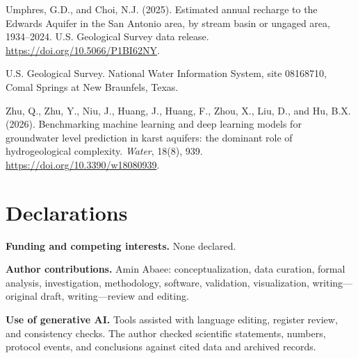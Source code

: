 \documentclass[11pt]{article}
\begin{document}
Umphres, G.D., and Choi, N.J. (2025). Estimated annual recharge to the Edwards Aquifer in the San Antonio area, by stream basin or ungaged area, 1934--2024. U.S. Geological Survey data release. \url{https://doi.org/10.5066/P1BI62NY}.

U.S. Geological Survey. National Water Information System, site 08168710, Comal Springs at New Braunfels, Texas.

Zhu, Q., Zhu, Y., Niu, J., Huang, J., Huang, F., Zhou, X., Liu, D., and Hu, B.X. (2026). Benchmarking machine learning and deep learning models for groundwater level prediction in karst aquifers: the dominant role of hydrogeological complexity. \emph{Water}, 18(8), 939. \url{https://doi.org/10.3390/w18080939}.

\normalsize
\section*{Declarations}
\textbf{Funding and competing interests.} None declared.

\textbf{Author contributions.} Amin Abaee: conceptualization, data curation, formal analysis, investigation, methodology, software, validation, visualization, writing---original draft, writing---review and editing.

\textbf{Use of generative AI.} Tools assisted with language editing, register review, and consistency checks. The author checked scientific statements, numbers, protocol events, and conclusions against cited data and archived records.
\end{document}

